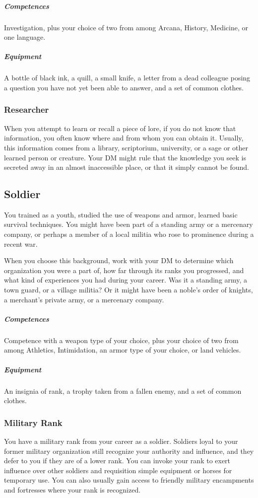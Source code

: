     \subparagraph{Competences} Investigation, plus your choice of two from among Arcana, History, Medicine, or one language.

    \subparagraph{Equipment} A bottle of black ink, a quill, a small knife, a letter from a dead colleague posing a question you have not yet been able to answer, and a set of common clothes.

    \subsubsection{Researcher} \label{feat::researcher}
        When you attempt to learn or recall a piece of lore, if you do not know that information, you often know where and from whom you can obtain it.
        Usually, this information comes from a library, scriptorium, university, or a sage or other learned person or creature.
        Your DM might rule that the knowledge you seek is secreted away in an almost inaccessible place, or that it simply cannot be found.

\subsection*{Soldier} \label{ssec::soldier}
    You trained as a youth, studied the use of weapons and armor, learned basic survival techniques. %
    You might have been part of a standing army or a mercenary company, or perhaps a member of a local militia who rose to prominence during a recent war.


    When you choose this background, work with your DM to determine which organization you were a part of, how far through its ranks you progressed, and what kind of experiences you had during your career.
    Was it a standing army, a town guard, or a village militia?
    Or it might have been a noble's order of knights, a merchant's private army, or a mercenary company.

    \subparagraph{Competences} Competence with a weapon type of your choice, plus your choice of two from among Athletics, Intimidation, an armor type of your choice, or land vehicles.

    \subparagraph{Equipment} An insignia of rank, a trophy taken from a fallen enemy, and a set of common clothes.

    \subsubsection{Military Rank}
        You have a military rank from your career as a soldier.
        Soldiers loyal to your former military organization still recognize your authority and influence, and they defer to you if they are of a lower rank.
        You can invoke your rank to exert influence over other soldiers and requisition simple equipment or horses for temporary use.
        You can also usually gain access to friendly military encampments and fortresses where your rank is recognized.

